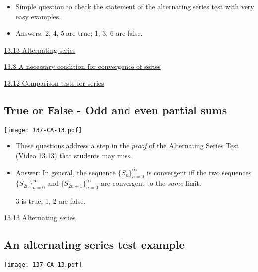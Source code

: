 \documentclass[11pt]{article}
\newcommand {\DS} [1] {${\displaystyle #1}$}
\newcommand{\nl}{\hfill \vspace{-1.1\baselineskip}} %
\newcommand{\vviii}{\hspace{8mm} \href{https://www.youtube.com/watch?v=kP9qHkTSNpI&list=PLlwePzQY_wW-FJMnD_ybkXU_jZLVtZttI&index=8}{13.8 A necessary condition for convergence of series} }
\newcommand{\vxii}{\hspace{8mm} \href{https://www.youtube.com/watch?v=QbYK4COJUqU&list=PLlwePzQY_wW-FJMnD_ybkXU_jZLVtZttI&index=12}{13.12 Comparison tests for series} }
\newcommand{\vxiii}{\hspace{8mm} \href{https://www.youtube.com/watch?v=OM9U6Pwze8E&list=PLlwePzQY_wW-FJMnD_ybkXU_jZLVtZttI&index=13}{13.13 Alternating series} }
\begin{document}
\begin{comments}
\nl
	\begin{itemize}
		\item   Simple question to check the statement of the alternating series test with very easy examples.  
		\item  Answers:  2, 4, 5 are true; 1, 3, 6 are false.
	\end{itemize}
\end{comments}

\begin{videos}
\vxiii

\vviii

\vxii
\end{videos}

\newpage
\subsection{True or False - Odd and even partial sums}

\begin{center}
{ \texttt{[image: 137-CA-13.pdf]}} 
\end{center}

\begin{comments}
\nl
	\begin{itemize}
		\item   These questions address a step in the \emph{proof} of the Alternating Series Test (Video 13.13) that students may miss.
		\item Answer:  In general, the sequence \DS{\{S_n\}_{n=0}^{\infty}} is convergent iff the two sequences \DS{\{S_{2n}\}_{n=0}^{\infty}} and \DS{\{S_{2n+1}\}_{n=0}^{\infty}} are convergent to the \emph{same} limit. 
				
		3 is true; 1, 2 are false.
	\end{itemize}
\end{comments}

\begin{videos}
\vxiii
\end{videos}

\newpage
\subsection{An alternating series test example}

\begin{center}
{ \texttt{[image: 137-CA-13.pdf]}} 
\end{center}
\end{document}
